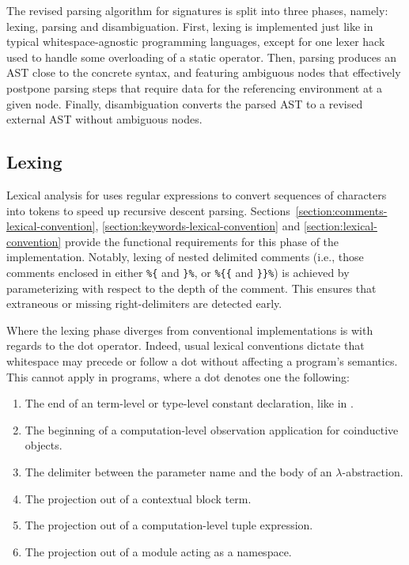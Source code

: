 The revised parsing algorithm for \Beluga signatures is split into three phases, namely: lexing, parsing and disambiguation.
First, lexing is implemented just like in typical whitespace-agnostic programming languages, except for one lexer hack used to handle some overloading of a static operator.
Then, parsing produces an \ac{AST} close to the concrete syntax, and featuring ambiguous nodes that effectively postpone parsing steps that require data for the referencing environment at a given node.
Finally, disambiguation converts the parsed \ac{AST} to a revised external \ac{AST} without ambiguous nodes.

\subsection{Lexing}

Lexical analysis for \Beluga uses regular expressions to convert sequences of characters into tokens to speed up recursive descent parsing.
Sections~\ref{section:comments-lexical-convention}, \ref{section:keywords-lexical-convention} and \ref{section:lexical-convention} provide the functional requirements for this phase of the implementation.
Notably, lexing of nested delimited comments (i.e., those comments enclosed in either \verb|%{| and \verb|}%|, or \verb|%{{| and \verb|}}%|) is achieved by parameterizing with respect to the depth of the comment.
This ensures that extraneous or missing right-delimiters are detected early.

Where the lexing phase diverges from conventional implementations is with regards to the dot operator.
Indeed, usual lexical conventions dictate that whitespace may precede or follow a dot without affecting a program's semantics.
This cannot apply in \Beluga programs, where a dot denotes one the following:
\begin{enumerate}
\item
The end of an \LF term-level or type-level constant declaration, like in \Twelf.
\item
The beginning of a computation-level observation application for coinductive objects.
\item
The delimiter between the parameter name and the body of an \LF $\lambda$-abstraction.
\item
The projection out of a contextual \LF block term.
\item
The projection out of a computation-level tuple expression.
\item
The projection out of a module acting as a namespace.
\end{enumerate}

